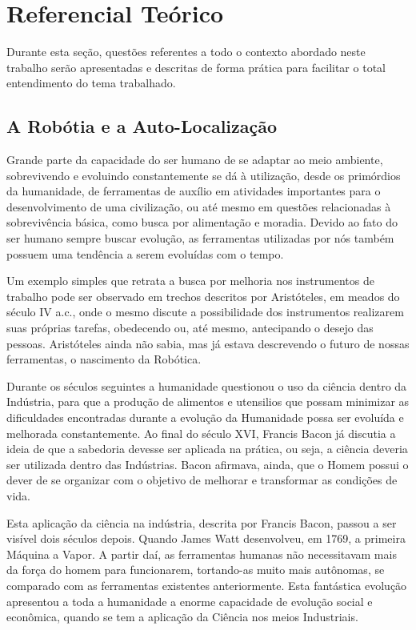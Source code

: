 
\chapter[Referencial Teórico]{Referencial Teórico}
	
	Durante esta seção, questões referentes a todo o contexto abordado neste trabalho serão apresentadas e descritas de forma prática para facilitar o total entendimento do tema trabalhado.

\section{A Robótia e a Auto-Localização}

	Grande parte da capacidade do ser humano de se adaptar ao meio ambiente, sobrevivendo e evoluindo constantemente se dá à utilização, desde os primórdios da humanidade, de ferramentas de auxílio em atividades importantes para o desenvolvimento de uma civilização, ou até mesmo em questões relacionadas à sobrevivência básica, como busca por alimentação e moradia. Devido ao fato do ser humano sempre buscar evolução, as ferramentas utilizadas por nós também possuem uma tendência a serem evoluídas com o tempo.

	Um exemplo simples que retrata a busca por melhoria nos instrumentos de trabalho pode ser observado em trechos descritos por Aristóteles, em meados do século IV a.c., onde o mesmo discute a possibilidade dos instrumentos realizarem suas próprias tarefas, obedecendo ou, até mesmo, antecipando o desejo das pessoas. Aristóteles ainda não sabia, mas já estava descrevendo o futuro de nossas ferramentas, o nascimento da Robótica.

	Durante os séculos seguintes a humanidade questionou o uso da ciência dentro da Indústria, para que a produção de alimentos e utensilios que possam minimizar as dificuldades encontradas durante a evolução da Humanidade possa ser evoluída e melhorada constantemente. Ao final do século XVI, Francis Bacon já discutia a ideia de que a sabedoria devesse ser aplicada na prática, ou seja, a ciência deveria ser utilizada dentro das Indústrias. Bacon afirmava, ainda, que o Homem possui o dever de se organizar com o objetivo de melhorar e transformar as condições de vida.

	Esta aplicação da ciência na indústria, descrita por Francis Bacon, passou a ser visível dois séculos depois. Quando James Watt desenvolveu, em 1769, a primeira Máquina a Vapor. A partir daí, as ferramentas humanas não necessitavam mais da força do homem para funcionarem, tortando-as muito mais autônomas, se comparado com as ferramentas existentes anteriormente. Esta fantástica evolução apresentou a toda a humanidade a enorme capacidade de evolução social e econômica, quando se tem a aplicação da Ciência nos meios Industriais.

